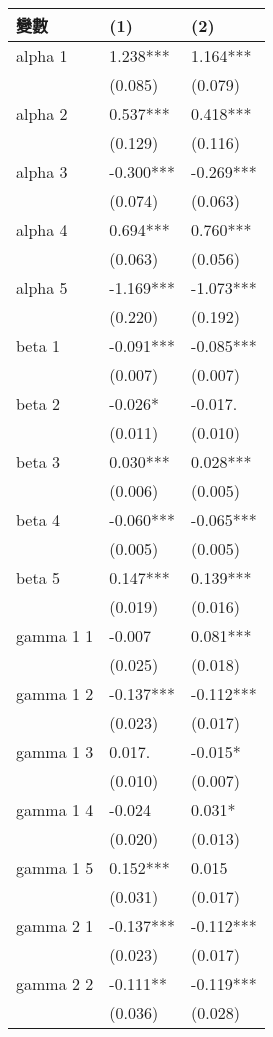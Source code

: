 \begin{tabular}{lll}
  \hline
變數 & (1) & (2) \\ 
  \hline
alpha 1 & 1.238*** & 1.164*** \\ 
   & (0.085) & (0.079) \\ 
  alpha 2 & 0.537*** & 0.418*** \\ 
   & (0.129) & (0.116) \\ 
  alpha 3 & -0.300*** & -0.269*** \\ 
   & (0.074) & (0.063) \\ 
  alpha 4 & 0.694*** & 0.760*** \\ 
   & (0.063) & (0.056) \\ 
  alpha 5 & -1.169*** & -1.073*** \\ 
   & (0.220) & (0.192) \\ 
  beta 1 & -0.091*** & -0.085*** \\ 
   & (0.007) & (0.007) \\ 
  beta 2 & -0.026* & -0.017. \\ 
   & (0.011) & (0.010) \\ 
  beta 3 & 0.030*** & 0.028*** \\ 
   & (0.006) & (0.005) \\ 
  beta 4 & -0.060*** & -0.065*** \\ 
   & (0.005) & (0.005) \\ 
  beta 5 & 0.147*** & 0.139*** \\ 
   & (0.019) & (0.016) \\ 
  gamma 1 1 & -0.007 & 0.081*** \\ 
   & (0.025) & (0.018) \\ 
  gamma 1 2 & -0.137*** & -0.112*** \\ 
   & (0.023) & (0.017) \\ 
  gamma 1 3 & 0.017. & -0.015* \\ 
   & (0.010) & (0.007) \\ 
  gamma 1 4 & -0.024 & 0.031* \\ 
   & (0.020) & (0.013) \\ 
  gamma 1 5 & 0.152*** & 0.015 \\ 
   & (0.031) & (0.017) \\ 
  gamma 2 1 & -0.137*** & -0.112*** \\ 
   & (0.023) & (0.017) \\ 
  gamma 2 2 & -0.111** & -0.119*** \\ 
   & (0.036) & (0.028) \\ 

\end{tabular}
